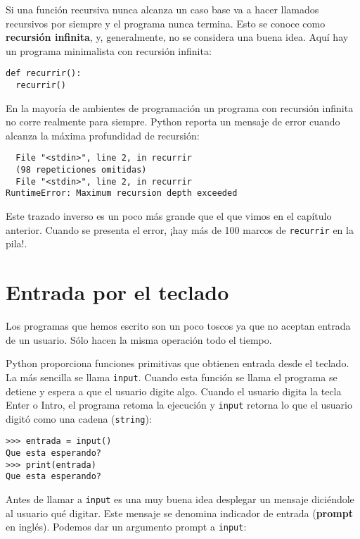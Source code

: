   
 

Si una función recursiva nunca alcanza un caso base va a hacer llamados
recursivos por siempre y el programa nunca termina. Esto se conoce
como \textbf{recursión infinita}, y, generalmente, no se considera
una buena idea. Aquí hay un programa minimalista con recursión infinita:

\begin{lstlisting}
def recurrir():
  recurrir()
\end{lstlisting}
 En la mayoría de ambientes de programación un programa con recursión
infinita no corre realmente para siempre. Python reporta un mensaje
de error cuando alcanza la máxima profundidad de recursión:
\begin{verbatim}
  File "<stdin>", line 2, in recurrir
  (98 repeticiones omitidas)
  File "<stdin>", line 2, in recurrir
RuntimeError: Maximum recursion depth exceeded
\end{verbatim}
Este trazado inverso es un poco más grande que el que vimos en el
capítulo anterior. Cuando se presenta el error, ¡hay más de 100 marcos
de \texttt{recurrir} en la pila!.

\section{Entrada por el teclado}

Los programas que hemos escrito son un poco toscos ya que no aceptan
entrada de un usuario. Sólo hacen la misma operación todo el tiempo.

Python proporciona funciones primitivas que obtienen entrada desde
el teclado. La más sencilla se llama \texttt{input}. Cuando esta
función se llama el programa se detiene y espera a que el usuario
digite algo. Cuando el usuario digita la tecla Enter o Intro, el programa
retoma la ejecución y \texttt{input} retorna lo que el usuario
digitó como una cadena (\texttt{string}):

\begin{lstlisting}
>>> entrada = input()
Que esta esperando?
>>> print(entrada)
Que esta esperando?
\end{lstlisting}
 Antes de llamar a \texttt{input} es una muy buena idea desplegar
un mensaje diciéndole al usuario qué digitar. Este mensaje se denomina
indicador de entrada (\textbf{prompt} en inglés). Podemos dar un argumento
prompt a \texttt{input}:

